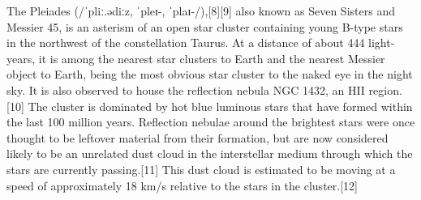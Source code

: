 The Pleiades (/ˈpliː.ədiːz, ˈpleɪ-, ˈplaɪ-/),[8][9] also known as Seven Sisters and Messier 45, is an asterism of an open star cluster containing young B-type stars in the northwest of the constellation Taurus. At a distance of about 444 light-years, it is among the nearest star clusters to Earth and the nearest Messier object to Earth, being the most obvious star cluster to the naked eye in the night sky. It is also observed to house the reflection nebula NGC 1432, an HII region.[10] The cluster is dominated by hot blue luminous stars that have formed within the last 100 million years. Reflection nebulae around the brightest stars were once thought to be leftover material from their formation, but are now considered likely to be an unrelated dust cloud in the interstellar medium through which the stars are currently passing.[11] This dust cloud is estimated to be moving at a speed of approximately 18 km/s relative to the stars in the cluster.[12]
